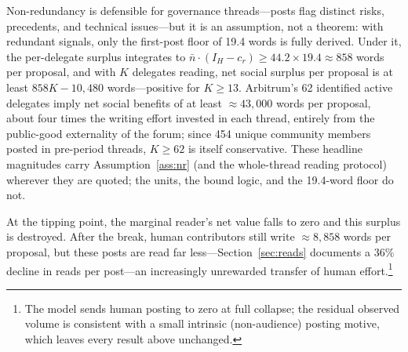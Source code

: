 \documentclass[12pt]{article}
\begin{document}
Non-redundancy is defensible for governance threads---posts flag distinct risks, precedents, and technical issues---but it is an assumption, not a theorem: with redundant signals, only the first-post floor of 19.4 words is fully derived. Under it, the per-delegate surplus integrates to $\bar{n} \cdot (I_H - c_r) \ge 44.2 \times 19.4 \approx 858$ words per proposal, and with $K$ delegates reading, net social surplus per proposal is at least $858K - 10{,}480$ words---positive for $K \ge 13$. Arbitrum's 62 identified active delegates imply net social benefits of at least $\approx 43{,}000$ words per proposal, about four times the writing effort invested in each thread, entirely from the public-good externality of the forum; since 454 unique community members posted in pre-period threads, $K \ge 62$ is itself conservative. These headline magnitudes carry Assumption~\ref{ass:nr} (and the whole-thread reading protocol) wherever they are quoted; the units, the bound logic, and the 19.4-word floor do not.

At the tipping point, the marginal reader's net value falls to zero and this surplus is destroyed. After the break, human contributors still write $\approx 8{,}858$ words per proposal, but these posts are read far less---Section~\ref{sec:reads} documents a 36\% decline in reads per post---an increasingly unrewarded transfer of human effort.\footnote{The model sends human posting to zero at full collapse; the residual observed volume is consistent with a small intrinsic (non-audience) posting motive, which leaves every result above unchanged.}
\end{document}
